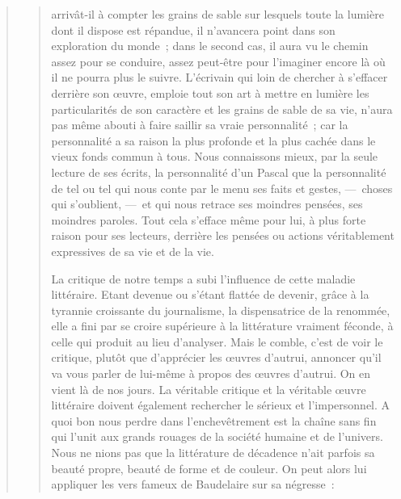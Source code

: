 \documentclass[french,twoside]{book} %
\begin{document}
\begin{verse}
\begin{verse}
arrivât-il à compter les grains de sable sur lesquels toute la lumière dont il dispose est répandue, il n’avancera point dans son exploration du monde ; dans le second cas, il aura vu le chemin assez pour se conduire, assez peut-être pour l’imaginer encore là où il ne pourra plus le suivre. L’écrivain qui loin de chercher à s’effacer derrière son œuvre, emploie tout son art à mettre en lumière les particularités de son caractère et les grains de sable de sa vie, n’aura pas même abouti à faire saillir sa vraie personnalité ; car la personnalité a sa raison la plus profonde et la plus cachée dans le vieux fonds commun à tous. Nous connaissons mieux, par la seule lecture de ses écrits, la personnalité d’un Pascal que la personnalité de tel ou tel qui nous conte par le menu ses faits et gestes, — choses qui s’oublient, — et qui nous retrace ses moindres pensées, ses moindres paroles. Tout cela s’efface même pour lui, à plus forte raison pour ses lecteurs, derrière les pensées ou actions véritablement expressives de sa vie et de la vie.\par
La critique de notre temps a subi l’influence de cette maladie littéraire. Etant devenue ou s’étant flattée de devenir, grâce à la tyrannie croissante du journalisme, la dispensatrice de la renommée, elle a fini par se croire supérieure à la littérature vraiment féconde, à celle qui produit au lieu d’analyser. Mais le comble, c’est de voir le critique, plutôt que d’apprécier les œuvres d’autrui, annoncer qu’il va vous parler de lui-même à propos des œuvres d’autrui. On en vient là de nos jours. La véritable critique et la véritable œuvre littéraire doivent également rechercher le sérieux et l’impersonnel. A quoi bon nous perdre dans l’enchevêtrement est la chaîne sans fin qui l’unit aux grands rouages de la société humaine et de l’univers. Nous ne nions pas que la littérature de décadence n’ait parfois sa beauté propre, beauté de forme et de couleur. On peut alors lui appliquer les vers fameux de Baudelaire sur sa négresse :\par



\end{verse}
\end{verse}
\end{document}
